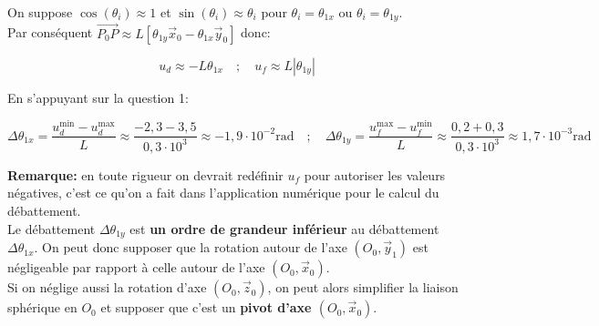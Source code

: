 \ifprof
\begin{corrige}
On suppose $\cos(\theta_{i}) \approx 1$ et $\sin(\theta_{i}) \approx \theta_{i}$ pour $\theta_i = \theta_{1x}$ ou $\theta_i = \theta_{1y}$.\\

Par conséquent $\overrightarrow{P_0P} \approx L\left[ \theta_{1y}\overrightarrow{x}_0 - \theta_{1x}\overrightarrow{y}_0 \right]$ donc:

$$ \boxed{u_d \approx -L \theta_{1x}} \quad ; \quad \boxed{u_f \approx L|\theta_{1y}|} $$

En s'appuyant sur la question 1:

$$ \boxed{\Delta \theta_{1x} = \dfrac{u_d^{\text{min}} - u_d^{\text{max}}}{L} \approx \dfrac{-2,3 - 3,5}{0,3\cdot 10^{3}} \approx -1,9\cdot 10^{-2}\text{rad}} \quad ; \quad \boxed{\Delta \theta_{1y} = \dfrac{u_f^{\text{max}} - u_f^{\text{min}}}{L} \approx \dfrac{0,2 + 0,3}{0,3\cdot 10^{3}} \approx 1,7\cdot 10^{-3}\text{rad}} $$

\textbf{Remarque:} en toute rigueur on devrait redéfinir $u_f$ pour autoriser les valeurs négatives, c'est ce qu'on a fait dans l'application numérique pour le calcul du débattement.\\

Le débattement $\Delta \theta_{1y}$ est \textbf{un ordre de grandeur inférieur} au débattement $\Delta \theta_{1x}$. On peut donc supposer que la rotation autour de l'axe $\left( O_0,\overrightarrow{y}_1 \right)$ est négligeable par rapport à celle autour de l'axe $\left( O_0,\overrightarrow{x}_0 \right)$.\\

Si on néglige aussi la rotation d'axe $\left( O_0,\overrightarrow{z}_0 \right)$, on peut alors simplifier la liaison sphérique en $O_0$ et supposer que c'est un \textbf{pivot d'axe $\left( O_0,\overrightarrow{x}_0 \right)$}.
\end{corrige}
\else
\fi


